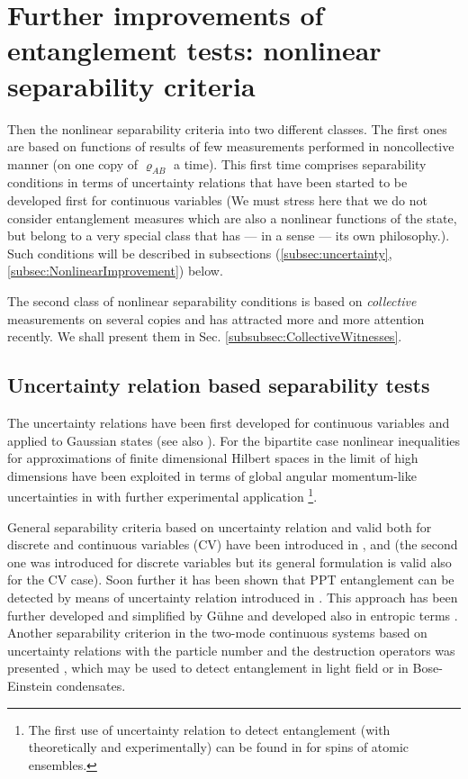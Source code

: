 \documentclass[twocolumn,aps,rmp]{revtex4}
\begin{document}
\section{Further improvements of entanglement tests: nonlinear separability criteria}

Then the nonlinear separability criteria into two different classes.
The first ones are based on functions of results of few measurements
performed in noncollective manner (on one copy of $\varrho_{AB}$ a
time). This first time comprises separability conditions in terms of
uncertainty relations that have been started to be developed first for
continuous variables (We must stress here that we do not consider
entanglement measures which are also a nonlinear functions of the
state, but belong to a very special class that has --- in a sense ---
its own philosophy.). Such conditions will be described in subsections
(\ref{subsec:uncertainty}, \ref{subsec:NonlinearImprovement}) below.

The second class of nonlinear separability conditions is based on
{\it collective} measurements on several copies and has attracted
more and more attention recently. We shall present them in
Sec. \ref{subsubsec:CollectiveWitnesses}.



\subsection{Uncertainty relation based separability tests
\label{subsec:uncertainty}}

The uncertainty relations have been first developed for continuous
variables and applied to Gaussian states \cite{DuanGCZ1999-criterion}
(see also \cite{ManciniGVT2001-criterion}). For the bipartite case
nonlinear inequalities for approximations of finite dimensional
Hilbert spaces in the limit of high dimensions have been exploited in
terms of global angular momentum-like uncertainties in \cite{Polzik0}
with further experimental application \cite{PolzikJK}\footnote {The first use of uncertainty relation to detect
entanglement (with theoretically and experimentally) can be found in \cite {HaldSSP1999} for spins of atomic ensembles.}.

General separability criteria based on uncertainty relation and valid
both for discrete and continuous variables (CV) have been introduced
in \cite{Giovannetti1}, and \cite{HofmannT} (the second one was
introduced for discrete variables but its general formulation is valid
also for the CV case). Soon further it has been shown \cite{Hoffman2}
that PPT entanglement can be detected by means of uncertainty relation
introduced in \cite{HofmannT}. This approach has been further
developed and simplified by G{\"u}hne \cite{OGuehne} and developed
also in entropic terms \cite{GuehneL2004-pra}. Another separability criterion in the two-mode continuous systems
based on uncertainty relations with the particle number and the destruction operators
was presented \cite{TothSC2003}, which may be used to detect entanglement  in light  field
 or in Bose-Einstein condensates.
\end{document}
